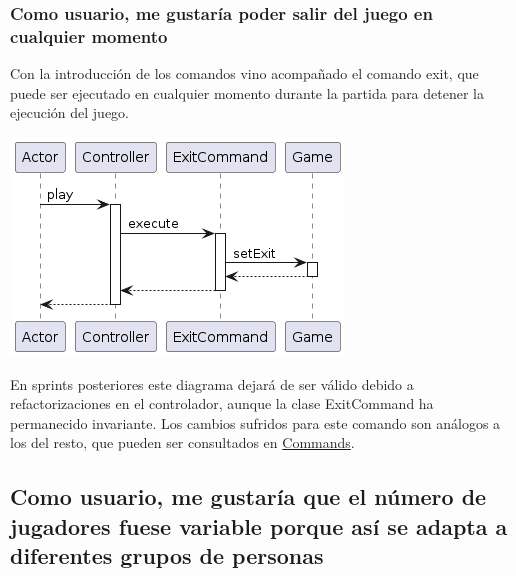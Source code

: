 \documentclass[../DocumentoOficial.tex]{subfiles}
\begin{document}
\subsubsection{Como usuario, me gustaría poder salir del juego en cualquier momento}
\begin{sprint}[2]
Con la introducción de los comandos vino acompañado el comando exit, que puede ser ejecutado en cualquier momento durante la partida para detener la ejecución del juego.

\begin{center}
\includegraphics[scale=0.5]{exit-sprint2.png}
\end{center}

En sprints posteriores este diagrama dejará de ser válido debido a refactorizaciones en el controlador, aunque la clase ExitCommand ha permanecido invariante. Los cambios sufridos para este comando son análogos a los del resto, que pueden ser consultados en \hyperref[ch:Commands]{Commands}.
\end{sprint}

\subsection{Como usuario, me gustaría que el número de jugadores fuese variable porque así se adapta a diferentes grupos de personas}
\end{document}
